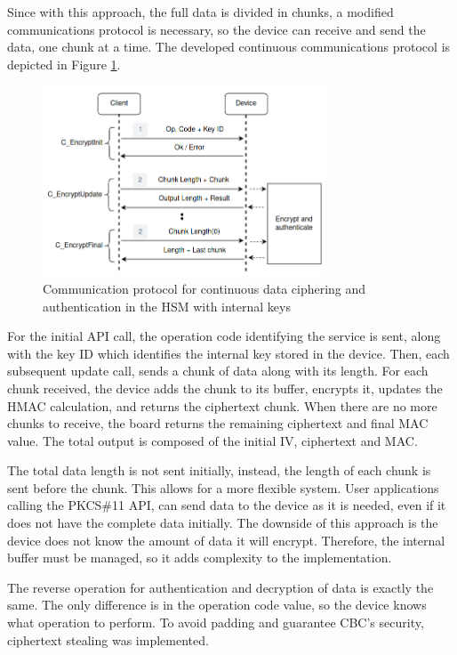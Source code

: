 Since with this approach, the full data is divided in chunks, a modified communications protocol is necessary, so the device can receive and send the data, one chunk at a time.  The developed continuous communications protocol is depicted in Figure \ref{fig:protocol:data-exchange-chunks}.
\begin{figure}[h!]
	\centering
	\includegraphics[width=0.75\textwidth]{./Images/data-exchange-chunks.png}
	\caption{Communication protocol for continuous data ciphering and authentication in the HSM with internal keys}
	\label{fig:protocol:data-exchange-chunks}
\end{figure}
For the initial API call, the operation code identifying the service is sent, along with the key ID which identifies the internal key stored in the device.
Then, each subsequent update call, sends a chunk of data along with its length.
For each chunk received, the device adds the chunk to its buffer, encrypts it, updates the HMAC calculation, and returns the ciphertext chunk.
When there are no more chunks to receive, the board returns the remaining ciphertext and final MAC value. The total output is composed of the initial IV, ciphertext and MAC.

The total data length is not sent initially, instead, the length of each chunk is sent before the chunk. This allows for a more flexible system. User applications calling the PKCS\#11 API, can send data to the device as it is needed, even if it does not have the complete data initially.
The downside of this approach is the device does not know the amount of data it will encrypt. Therefore, the internal buffer must be managed, so it adds complexity to the implementation.

The reverse operation for authentication and decryption of data is exactly the same. The only difference is in the operation code value, so the device knows what operation to perform.
To avoid padding and guarantee CBC's security, ciphertext stealing was implemented.

